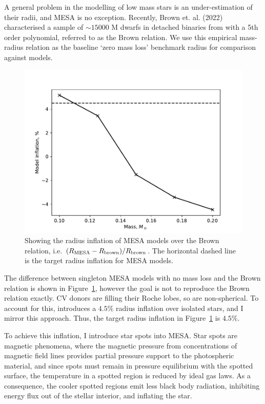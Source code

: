 A general problem in the modelling of low mass stars is an under-estimation of their radii, and MESA is no exception. Recently, Brown et. al. (2022) characterised a sample of $\sim 15000$ M dwarfs in detached binaries from \citet{parsons2018} with a 5th order polynomial, referred to as the Brown relation. We use this empirical mass-radius relation as the baseline `zero mass loss' benchmark radius for comparison against models.
\begin{figure}
    \centering
    \includegraphics[width=\textwidth]{figures/modelling/MESA_inflation_over_brown.pdf}
    \caption{Showing the radius inflation of MESA models over the Brown relation, i.e. $(R_{\rm MESA} - R_{\rm brown}) / R_{\rm brown}$. The horizontal dashed line is the target radius inflation for MESA models.}
    \label{fig:modelling:MESA inflation over Brown relation}
\end{figure}
The difference between singleton MESA models with no mass loss and the Brown relation is shown in Figure~\ref{fig:modelling:MESA inflation over Brown relation}, however the goal is not to reproduce the Brown relation exactly.
CV donors are filling their Roche lobes, so are non-spherical. To account for this, \citet{knigge11} introduces a $4.5\%$ radius inflation over isolated stars, and I mirror this approach. Thus, the target radius inflation in Figure~\ref{fig:modelling:MESA inflation over Brown relation} is $4.5\%$.

To achieve this inflation, I introduce star spots into MESA. Star spots are magnetic phenomena, where the magnetic pressure from concentrations of magnetic field lines provides partial pressure support to the photospheric material, and since spots must remain in pressure equilibrium with the spotted surface, the temperature in a spotted region is reduced by ideal gas laws. As a consequence, the cooler spotted regions emit less black body radiation, inhibiting energy flux out of the stellar interior, and inflating the star.

